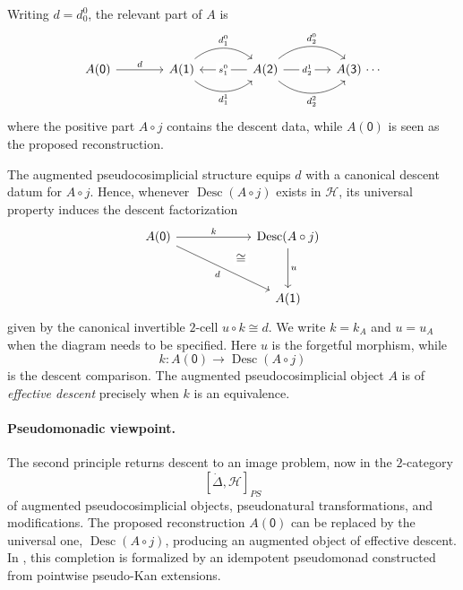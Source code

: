 \documentclass[11pt,a4paper]{article}
\numberwithin{equation}{section}
\theoremstyle{definition}
\theoremstyle{remark}
\newcommand{\Hcat}{\mathcal H}
\newcommand{\Desc}{\operatorname{Desc}}
\begin{document}
Writing \(d=d_0^0\), the relevant part of \(A\) is
\[
\begin{tikzcd}[column sep=3.8em]
  A(\mathsf 0) \ar[r,"d"]
  & A(\mathsf 1)
    \ar[r,bend left=40,"d_1^0"]
    \ar[r,bend right=40,"d_1^1"']
  & A(\mathsf 2)
    \ar[l,"s_1^0" description]
    \ar[r,bend left=40,"d_2^0"]
    \ar[r,"d_2^1" description]
    \ar[r,bend right=40,"d_2^2"']
  & A(\mathsf 3)  \, \cdots 
\end{tikzcd}
\]
\noindent
where the positive part \(A \circ j\) contains the descent data, while \(A(\mathsf0)\) is seen as 
the proposed reconstruction. 


The augmented pseudocosimplicial structure equips \(d\) with a
canonical descent datum for \(A \circ j\). Hence, whenever \(\Desc(A \circ j)\)
exists in \(\Hcat\), its universal property induces the descent
factorization
\begin{equation}
\begin{tikzcd}[column sep=6.0em,row sep=3.2em]
	A(\mathsf 0) \ar[r,"k"] \ar[dr,"d"',""{name=D}]
	& \Desc(A \circ j) \ar[d,"u"]
	\\
	& A(\mathsf 1)
	\ar[phantom,from=1-2,to=D,
	"\cong" description,pos=0.65]
\end{tikzcd}
\end{equation}
given by the canonical invertible \(2\)-cell \(u\circ k\cong d\).
We write \(k=k_A\) and \(u=u_A\) when the diagram needs to be specified.
Here \(u\) is the forgetful morphism, while
\[
k\colon A(\mathsf 0)\longrightarrow\Desc(A\circ j)
\]
is the descent comparison. The augmented pseudocosimplicial object
\(A\) is of \emph{effective descent} precisely when \(k\) is an
equivalence.

\paragraph{Pseudomonadic viewpoint.}
The second principle returns descent to an image problem, now in the
\(2\)-category
\[
[\dot\Delta,\Hcat]_{PS}
\]
of augmented pseudocosimplicial objects, pseudonatural transformations,
and modifications. The proposed reconstruction \(A(\mathsf 0)\) can be replaced
by the universal one, \(\Desc(A\circ j)\), producing an augmented object of
effective descent. In \cite{Nunes2018}, this completion is formalized
by an idempotent pseudomonad constructed from pointwise pseudo-Kan
extensions.
\end{document}
